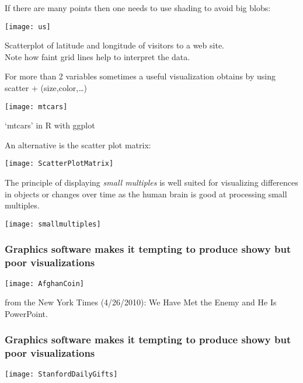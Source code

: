 \documentclass{beamer}
\begin{document}
\begin{frame}
If there are many points then one needs to use shading to avoid big blobs:
\begin{center}
\texttt{[image: us]}
\end{center}
Scatterplot of latitude and longitude of visitors to a web site.\\
Note how faint grid lines help to interpret the data.
\end{frame}

\begin{frame}
For more than 2 variables sometimes a useful visualization
obtains by using scatter + (size,color,\ldots)

\begin{center}
\texttt{[image: mtcars]}
\end{center}

`mtcars' in R with ggplot
\end{frame}

\begin{frame}
An alternative is the scatter plot matrix:

\begin{center}
\texttt{[image: ScatterPlotMatrix]}
\end{center}
\end{frame}

\begin{frame}
The principle of displaying {\sl small multiples} is well suited
for visualizing differences in objects or changes over time as the human
brain is good at processing small multiples.

\begin{center}
\texttt{[image: smallmultiples]}
\end{center}
\end{frame}
 
\begin{frame}
\frametitle{Graphics software makes it tempting to produce
showy but poor visualizations}

\begin{center}
\texttt{[image: AfghanCoin]}
\end{center}

from the New York Times (4/26/2010): We Have Met the Enemy and He
Is PowerPoint.
\end{frame}

\begin{frame}
\frametitle{Graphics software makes it tempting to produce
showy but poor visualizations}
\begin{center}
\texttt{[image: StanfordDailyGifts]}
\end{center}
\end{frame}
\end{document}
